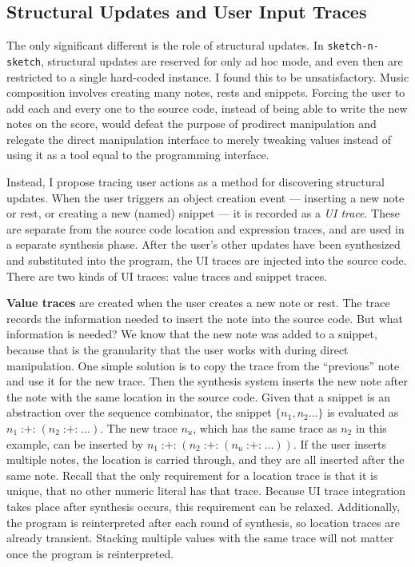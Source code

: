 \documentclass[nocopyrightspace,numbers,10pt]{sigplanconf}
\newcommand{\sketch}{\texttt{sketch-n-sketch}}
\DeclareMathOperator{\seqop}{:+:}
\begin{document}
\subsection{Structural Updates and User Input Traces}
\label{sub:tbs:usertraces}

The only significant different is the role of structural updates. In
\sketch{}, structural updates are reserved for only ad hoc mode, and even then
are restricted to a single hard-coded instance. I found this to be
unsatisfactory. Music composition involves creating many notes, rests and
snippets. Forcing the user to add each and every one to the source code, instead
of being able to write the new notes on the score, would defeat the purpose of
prodirect manipulation and relegate the direct manipulation interface to merely
tweaking values instead of using it as a tool equal to the programming
interface.

Instead, I propose tracing user actions as a method for discovering structural
updates. When the user triggers an object creation event --- inserting a new
note or rest, or creating a new (named) snippet --- it is recorded as a
\emph{UI trace}. These are separate from the source code location and expression
traces, and are used in a separate synthesis phase. After the user's other
updates have been synthesized and substituted into the program, the UI traces
are injected into the source code. There are two kinds of UI traces: value
traces and snippet traces.

\textbf{Value traces} are created when the user creates a new note or rest. The
trace records the information needed to insert the note into the source code.
But what information is needed? We know that the new note was added to a
snippet, because that is the granularity that the user works with during direct
manipulation. One simple solution is to copy the trace from the ``previous''
note and use it for the new trace. Then the synthesis system inserts the new
note after the note with the same location in the source code. Given that a
snippet is an abstraction over the sequence combinator, the snippet $\{n_1,
n_2\dots\}$ is evaluated as $n_1 \seqop (n_2 \seqop \dots)$. The new trace
$n_u$, which has the same trace as $n_2$ in this example, can be inserted by
$n_1 \seqop (n_2 \seqop (n_u \seqop \dots))$. If the user inserts multiple
notes, the location is carried through, and they are all inserted after the same
note. Recall that the only requirement for a location trace is that it is
unique, that no other numeric literal has that trace. Because UI trace integration
takes place after synthesis occurs, this requirement can be relaxed.
Additionally, the program is reinterpreted after each round of synthesis, so
location traces are already transient. Stacking multiple values with the same
trace will not matter once the program is reinterpreted.
\end{document}
